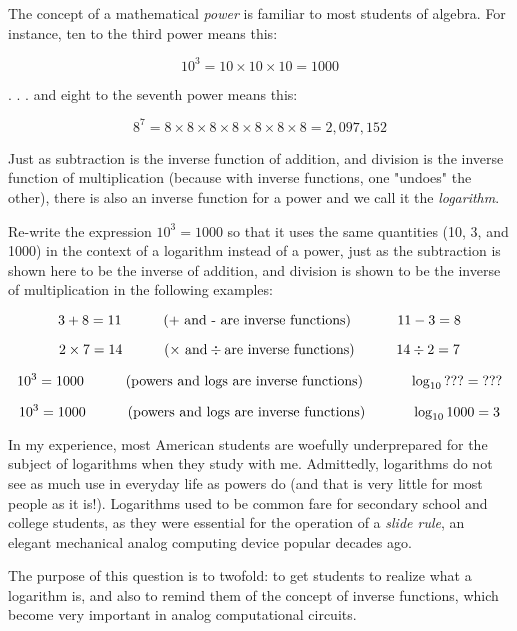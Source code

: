 

The concept of a mathematical {\it power} is familiar to most students of algebra.  For instance, ten to the third power means this:

$$10^3 = 10 \times 10 \times 10 = 1000$$

. . . and eight to the seventh power means this:

$$8^7 = 8 \times 8 \times 8 \times 8 \times 8 \times 8 \times 8 = 2,097,152$$

Just as subtraction is the inverse function of addition, and division is the inverse function of multiplication (because with inverse functions, one "undoes" the other), there is also an inverse function for a power and we call it the {\it logarithm}.

Re-write the expression $10^3 = 1000$ so that it uses the same quantities (10, 3, and 1000) in the context of a logarithm instead of a power, just as the subtraction is shown here to be the inverse of addition, and division is shown to be the inverse of multiplication in the following examples:

$$3 + 8 = 11 \hbox{\hskip 30pt (+ and - are inverse functions) \hskip 30pt} 11 - 3 = 8$$

$$2 \times 7 = 14 \hbox{\hskip 30pt} (\times \hbox{ and} \div \hbox{are inverse functions)} \hbox{\hskip 30pt} 14 \div 2 = 7$$

$$10^3 = 1000 \hbox{\hskip 30pt (powers and logs are inverse functions) \hskip 30pt} \log_{10} \hbox{???} = \hbox{???}$$







$$10^3 = 1000 \hbox{\hskip 30pt (powers and logs are inverse functions) \hskip 30pt} \log_{10} 1000 = 3$$







In my experience, most American students are woefully underprepared for the subject of logarithms when they study with me.  Admittedly, logarithms do not see as much use in everyday life as powers do (and that is very little for most people as it is!).  Logarithms used to be common fare for secondary school and college students, as they were essential for the operation of a {\it slide rule}, an elegant mechanical analog computing device popular decades ago.  

The purpose of this question is to twofold: to get students to realize what a logarithm is, and also to remind them of the concept of inverse functions, which become very important in analog computational circuits.




